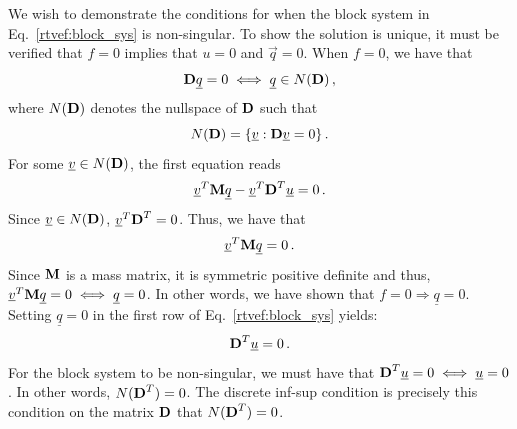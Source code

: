 \documentclass[../doc.tex]{subfiles}
\begin{document}
We wish to demonstrate the conditions for when the block system in Eq.~\ref{rtvef:block_sys} is non-singular. To show the solution is unique, it must be verified that $f = 0$ implies that $u = 0$ and $\vec{q} = 0$. When $f=0$, we have that 
	\begin{equation}
		\boldsymbol{\mathrm{D}} \underline{q} = 0 \iff \underline{q} \in N(\boldsymbol{\mathrm{D}}) \,,
	\end{equation}
where $N(\boldsymbol{\mathrm{D}})$ denotes the nullspace of $\boldsymbol{\mathrm{D}}$ such that 
	\begin{equation}
		N(\boldsymbol{\mathrm{D}}) = \{ \underline{v} : \boldsymbol{\mathrm{D}}\underline{v} = 0 \} \,. 
	\end{equation}
For some $\underline{v} \in N(\boldsymbol{\mathrm{D}})$, the first equation reads 
	\begin{equation}
		\underline{v}^T \boldsymbol{\mathrm{M}} \underline{q} - \underline{v}^T \boldsymbol{\mathrm{D}}^T \underline{u} = 0 \,. 
	\end{equation}
Since $\underline{v} \in N(\boldsymbol{\mathrm{D}})$, $\underline{v}^T \boldsymbol{\mathrm{D}}^T = 0$. Thus, we have that 
	\begin{equation}
		\underline{v}^T \boldsymbol{\mathrm{M}} \underline{q} = 0 \,. 
	\end{equation}
Since $\boldsymbol{\mathrm{M}}$ is a mass matrix, it is symmetric positive definite and thus, $\underline{v}^T \boldsymbol{\mathrm{M}}\underline{q} =0 \iff \underline{q} = 0$. In other words, we have shown that $f = 0 \Rightarrow \underline{q} = 0$. Setting $\underline{q} = 0$ in the first row of Eq.~\ref{rtvef:block_sys} yields: 
	\begin{equation}
		\boldsymbol{\mathrm{D}}^T \underline{u} = 0 \,. 
	\end{equation}
For the block system to be non-singular, we must have that $\boldsymbol{\mathrm{D}}^T \underline{u} = 0 \iff \underline{u} = 0$. In other words, $N(\boldsymbol{\mathrm{D}}^T) = 0$. The discrete inf-sup condition is precisely this condition on the matrix $\boldsymbol{\mathrm{D}}$ that $N(\boldsymbol{\mathrm{D}}^T) = 0$. 
\end{document}
